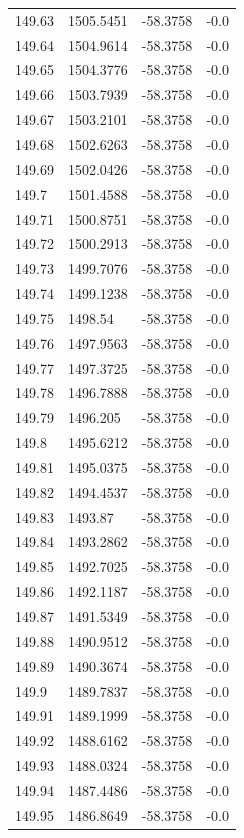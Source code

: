 \begin{table}[H]
\begin{tabular}{llll}
149.63 & 1505.5451 & -58.3758 & -0.0 \\
149.64 & 1504.9614 & -58.3758 & -0.0 \\
149.65 & 1504.3776 & -58.3758 & -0.0 \\
149.66 & 1503.7939 & -58.3758 & -0.0 \\
149.67 & 1503.2101 & -58.3758 & -0.0 \\
149.68 & 1502.6263 & -58.3758 & -0.0 \\
149.69 & 1502.0426 & -58.3758 & -0.0 \\
149.7 & 1501.4588 & -58.3758 & -0.0 \\
149.71 & 1500.8751 & -58.3758 & -0.0 \\
149.72 & 1500.2913 & -58.3758 & -0.0 \\
149.73 & 1499.7076 & -58.3758 & -0.0 \\
149.74 & 1499.1238 & -58.3758 & -0.0 \\
149.75 & 1498.54 & -58.3758 & -0.0 \\
149.76 & 1497.9563 & -58.3758 & -0.0 \\
149.77 & 1497.3725 & -58.3758 & -0.0 \\
149.78 & 1496.7888 & -58.3758 & -0.0 \\
149.79 & 1496.205 & -58.3758 & -0.0 \\
149.8 & 1495.6212 & -58.3758 & -0.0 \\
149.81 & 1495.0375 & -58.3758 & -0.0 \\
149.82 & 1494.4537 & -58.3758 & -0.0 \\
149.83 & 1493.87 & -58.3758 & -0.0 \\
149.84 & 1493.2862 & -58.3758 & -0.0 \\
149.85 & 1492.7025 & -58.3758 & -0.0 \\
149.86 & 1492.1187 & -58.3758 & -0.0 \\
149.87 & 1491.5349 & -58.3758 & -0.0 \\
149.88 & 1490.9512 & -58.3758 & -0.0 \\
149.89 & 1490.3674 & -58.3758 & -0.0 \\
149.9 & 1489.7837 & -58.3758 & -0.0 \\
149.91 & 1489.1999 & -58.3758 & -0.0 \\
149.92 & 1488.6162 & -58.3758 & -0.0 \\
149.93 & 1488.0324 & -58.3758 & -0.0 \\
149.94 & 1487.4486 & -58.3758 & -0.0 \\
149.95 & 1486.8649 & -58.3758 & -0.0 \\

\end{tabular}
\end{table}
